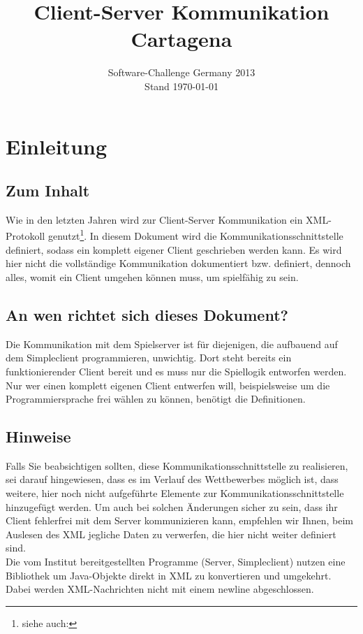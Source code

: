 \documentclass[12pt,a4paper, ngerman, oneside]{scrartcl}
\date{Software-Challenge Germany 2013\\Stand \today}
\title{Client-Server Kommunikation Cartagena}
\begin{document}
\maketitle
\thispagestyle{empty}
\tableofcontents
\thispagestyle{empty}
\newpage
\setcounter{page}{1}
\section{Einleitung}
\subsection*{Zum Inhalt} Wie in den letzten Jahren wird zur Client-Server
Kommunikation ein XML-Protokoll genutzt\footnote{siehe auch:
}. In diesem
Dokument wird die Kommunikationsschnittstelle definiert, sodass ein komplett
eigener Client geschrieben werden kann. Es wird hier nicht die vollständige
Kommunikation dokumentiert bzw. definiert, dennoch alles, womit ein Client
umgehen können muss, um spielfähig zu sein.
\subsection*{An wen richtet sich dieses Dokument?} Die Kommunikation mit dem
Spielserver ist für diejenigen, die aufbauend auf dem Simpleclient
programmieren, unwichtig. Dort steht bereits ein funktionierender Client bereit
und es muss nur die Spiellogik entworfen werden. \\
Nur wer einen komplett eigenen Client entwerfen will, beispielsweise um die
Programmiersprache frei wählen zu können, benötigt die Definitionen.

\subsection*{Hinweise} Falls Sie beabsichtigen sollten, diese
Kommunikationsschnittstelle zu realisieren, sei darauf hingewiesen, dass es im
Verlauf des Wettbewerbes möglich ist, dass weitere, hier noch nicht aufgeführte
Elemente zur Kommunikationsschnittstelle hinzugefügt werden. Um auch bei solchen
Änderungen sicher zu sein, dass ihr Client fehlerfrei mit dem Server
kommunizieren kann, empfehlen wir Ihnen, beim Auslesen des XML jegliche Daten zu
verwerfen, die hier nicht weiter definiert sind. \bigskip \\
Die vom Institut bereitgestellten Programme (Server, Simpleclient) nutzen eine
Bibliothek um Java-Objekte direkt in XML zu konvertieren und umgekehrt. 
Dabei werden XML-Nachrichten nicht mit einem newline abgeschlossen.
\end{document}
